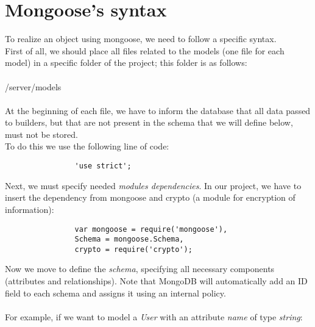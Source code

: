 \section{Mongoose's syntax}
To realize an object using mongoose, we need to follow a specific syntax.
\\First of all, we should place all files related to the models (one file for each model) in a specific folder of the project; this folder is as follows:
\\
\\/server/models
\\
\\At the beginning of each file, we have to inform the database that all data passed to builders, but that are not present in the schema that we will define below, must not be stored.
\\To do this we use the following line of code:

	
                \begin{lstlisting}
                'use strict';
                \end{lstlisting}
        

Next, we must specify needed \emph{modules dependencies}. In our project, we have to insert the dependency from mongoose and crypto (a module for encryption of information):

	
                \begin{lstlisting}      
                var mongoose = require('mongoose'),
                Schema = mongoose.Schema,
                crypto = require('crypto');
                \end{lstlisting}
        

Now we move to define the \emph{schema}, specifying all necessary components (attributes and relationships). Note that MongoDB will automatically add an ID field to each schema and assigns it using an internal policy.
\\
\\For example, if we want to model a \emph{User} with an attribute \emph{name} of type \emph{string}:

\newpage

